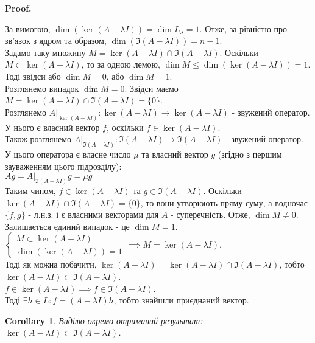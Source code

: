 \documentclass[a4paper, 10pt]{article}
\makeatletter
\theoremstyle{theoremdd}
\newtheorem{corollary}[theorem]{Corollary}
\renewenvironment{proof}[1][Proof.\\]{\par
\pushQED{\hfill \qed}%
\normalfont \topsep6\p@\@plus6\p@\relax
\trivlist
\item\relax
{\bfseries
#1\@addpunct{.}}\hspace\labelsep\ignorespaces
}{%
\popQED\endtrivlist\@endpefalse
}
\makeatother
\begin{document}
\begin{proof}
За вимогою, $\dim (\ker(A - \lambda I)) = \dim L_{\lambda} = 1$. Отже, за рівністю про зв'язок з ядром та образом, $\dim (\Im (A - \lambda I)) = n-1$.\\
Задамо таку множину $M=\ker(A-\lambda I) \cap \Im(A-\lambda I)$. Оскільки $M \subset \ker (A-\lambda I)$, то за одною лемою, $\dim M \leq \dim(\ker (A-\lambda I)) = 1$.
Тоді звідси або $\dim M = 0$, або $\dim M = 1$.
\bigskip \\
Розглянемо випадок $\dim M = 0$. Звідси маємо $M = \ker(A-\lambda I) \cap \Im(A-\lambda I) = \{0\}$.\\
Розглянемо $A |_{\ker(A-\lambda I)}: \ker(A-\lambda I) \to \ker(A-\lambda I)$ - звужений оператор. У нього є власний вектор $f$, оскільки $f \in \ker (A-\lambda I)$.\\
Також розглянемо $A |_{\Im(A-\lambda I)}: \Im(A-\lambda I) \to \Im(A-\lambda I)$ - звужений оператор. У цього оператора є власне число $\mu$ та власний вектор $g$ (згідно з першим зауваженням цього підрозділу):\\
$Ag = A |_{\Im(A-\lambda I)} g = \mu g$\\
Таким чином, $f \in \ker(A-\lambda I)$ та $g \in \Im(A-\lambda I)$. Оскільки $\ker ( A-\lambda I ) \cap \Im ( A - \lambda I ) = \{ 0 \}$, то вони утворюють пряму суму, а водночас $\{f,g\}$ - л.н.з. і є власними векторами для $A$ - суперечність. Отже, $\dim M \neq 0$.
\bigskip \\
Залишається єдиний випадок - це $\dim M = 1$.\\
$\begin{cases}
M \subset \ker(A-\lambda I)\\
\dim{(\ker(A-\lambda I))} = 1
\end{cases}
\implies M = \ker(A-\lambda I)$.
\bigskip \\
Тоді як можна побачити, $\ker(A-\lambda I) = \ker(A-\lambda I) \cap \Im (A - \lambda I)$, тобто $\ker(A-\lambda I) \subset \Im(A-\lambda I)$.\\
$f \in \ker (A- \lambda I) \implies f \in \Im(A - \lambda I)$.\\
Тоді $\exists h \in L: f = (A-\lambda I)h$, тобто знайшли приєднаний вектор.
\end{proof}

\begin{corollary}
Виділю окремо отриманий результат: $\ker (A-\lambda I) \subset \Im (A - \lambda I)$.
\end{corollary}
\end{document}
